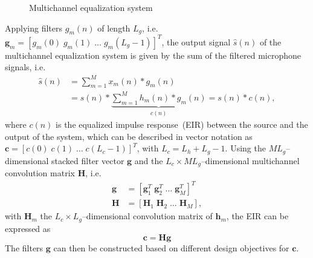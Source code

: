 \documentclass{article}
\begin{document}
\begin{figure}[b!]
  \caption{Multichannel equalization system}
  \label{fig: acsys}
\end{figure}
Applying filters $g_m(n)$ of length $L_g$, i.e. $\mathbf{g}_m = \left[g_m(0) \; g_m(1) \; \ldots \; g_m(L_g-1) \right]^T$, the output signal $\hat{s}(n)$ of the multichannel equalization system is given by the sum of the filtered microphone signals, i.e.
\begin{align}
  \hat{s}(n) & = \sum_{m=1}^{M} x_m(n) \ast g_m(n) \\
  & = s(n) \ast \underbrace{\sum_{m=1}^{M} h_m(n) \ast g_m(n)}_{c(n)} = s(n) \ast c(n),
\end{align}
where $c(n)$ is the equalized impulse response~(EIR) between the source and the output of the system, which can be described in vector notation as $\mathbf{c} = \left[c(0) \; c(1) \; \ldots \; c(L_c-1)\right]^T$, with $L_c = L_h+L_g-1$.
Using the $ML_g$--dimensional stacked filter vector $\mathbf{g}$ and the $L_c \times ML_g$--dimensional multichannel convolution matrix $\mathbf{H}$, i.e.
\begin{align}
  \mathbf{g}  &=  \left[\mathbf{g}_1^T \; \mathbf{g}_2^T \; \ldots \; \mathbf{g}_M^T \right]^T \\
  \mathbf{H}  &= \left[\mathbf{H}_1 \; \mathbf{H}_2 \; \ldots \; \mathbf{H}_M \right],
\end{align}
with $\mathbf{H}_m$ the $L_c \times L_g$--dimensional convolution matrix of $\mathbf{h}_m$, the EIR can be expressed as
\begin{equation}
\label{eq: eir}
\boxed{\mathbf{c} = \mathbf{H}\mathbf{g}}
\end{equation}
The filters $\mathbf{g}$ can then be constructed based on different design objectives for $\mathbf{c}$.
\end{document}
